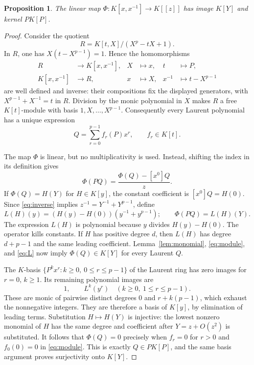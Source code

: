 \documentclass[11pt]{article}
\newtheorem{proposition}[theorem]{Proposition}
\theoremstyle{remark}
\begin{document}
\begin{proposition}\label{prop:kernel}
The linear map $\Phi:K[x,x^{-1}]\longrightarrow K[[z]]$ has image $K[Y]$
and kernel $P K[P]$.
\end{proposition}
\begin{proof}
Consider the quotient
\[
 R=K[t,X]/(X^p-tX+1).
\]
In $R$, one has $X(t-X^{p-1})=1$. Hence the homomorphisms
\begin{align*}
 R&\longrightarrow K[x,x^{-1}], & X&\longmapsto x,&t&\longmapsto P,\\
 K[x,x^{-1}]&\longrightarrow R, & x&\longmapsto X,&x^{-1}&\longmapsto t-X^{p-1}
\end{align*}
are well defined and inverse: their compositions fix the displayed
generators, with $X^{p-1}+X^{-1}=t$ in $R$.
Division by the monic polynomial in $X$ makes $R$ a free $K[t]$-module
with basis $1,X,\ldots,X^{p-1}$. Consequently every Laurent polynomial
has a unique expression
\begin{equation}\label{eq:module}
 Q=\sum_{r=0}^{p-1}f_r(P)x^r,\qquad f_r\in K[t].
\end{equation}

The map $\Phi$ is linear, but no multiplicativity is used. Instead, shifting
the index in its definition gives
\begin{equation}\label{eq:shift}
 \Phi(PQ)=\frac{\Phi(Q)-[x^0]Q}{z}.
\end{equation}
If $\Phi(Q)=H(Y)$ for $H\in K[y]$, the constant coefficient is
$[x^0]Q=H(0)$. Since \eqref{eq:inverse} implies
$z^{-1}=Y^{-1}+Y^{p-1}$, define
\begin{equation}\label{eq:L}
 L(H)(y)=(H(y)-H(0))(y^{-1}+y^{p-1});
 \qquad \Phi(PQ)=L(H)(Y).
\end{equation}
The expression $L(H)$ is polynomial because $y$ divides $H(y)-H(0)$.
The operator kills constants. If $H$ has positive degree $d$, then $L(H)$
has degree $d+p-1$ and the same leading coefficient.
Lemma~\ref{lem:monomial}, \eqref{eq:module}, and \eqref{eq:L} now imply
$\Phi(Q)\in K[Y]$ for every Laurent $Q$.

The $K$-basis $\{P^k x^r:k\geq0,\ 0\leq r\leq p-1\}$ of the Laurent
ring has zero images for $r=0$, $k\geq1$. Its remaining polynomial images are
\[
 1,\qquad L^k(y^r)\quad(k\geq0,\ 1\leq r\leq p-1).
\]
These are monic of pairwise distinct degrees $0$ and $r+k(p-1)$,
which exhaust the nonnegative integers. They are therefore a basis of
$K[y]$, by elimination of leading terms.
Substitution $H\mapsto H(Y)$ is injective: the lowest nonzero monomial of
$H$ has the same degree and coefficient after $Y=z+O(z^2)$ is substituted.
It follows that $\Phi(Q)=0$ precisely when $f_r=0$ for $r>0$ and
$f_0(0)=0$ in \eqref{eq:module}. This is exactly $Q\in P K[P]$,
and the same basis argument proves surjectivity onto $K[Y]$.
\end{proof}
\end{document}
